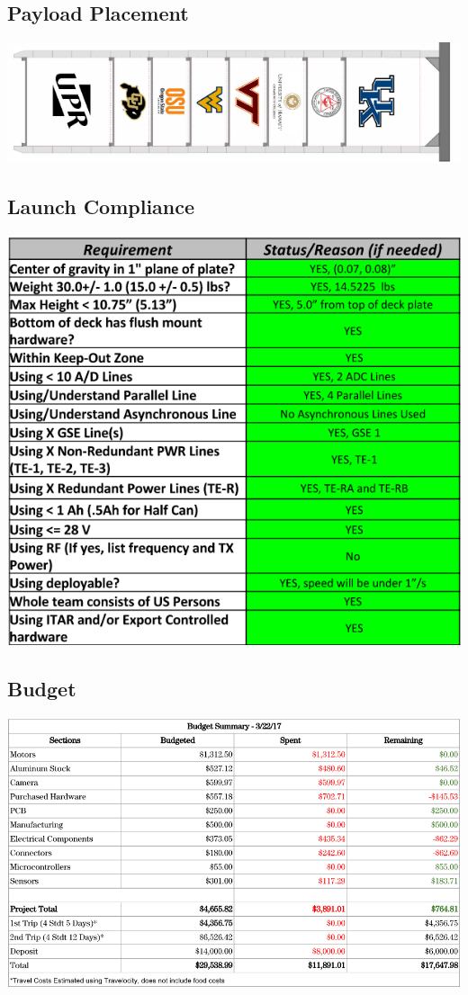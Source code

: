 \subsection{Payload Placement}
\includegraphics[width=\textwidth]{./images/OtherDocs/placement}

\subsection{Launch Compliance}
\includegraphics[width=\textwidth]{./images/OtherDocs/userGuideCompliance}

\subsection{Budget}
\includegraphics[width=\textwidth]{./images/OtherDocs/budget}
